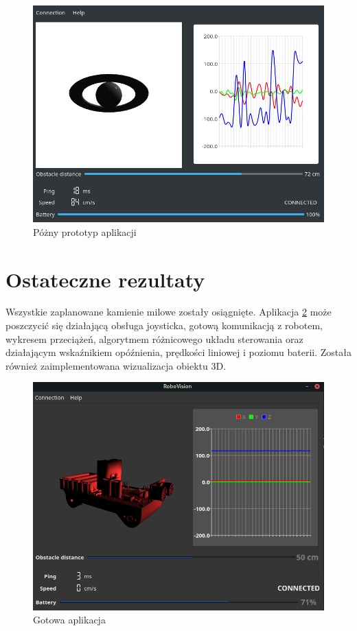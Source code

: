 \documentclass[12pt,a4paper,polish]{article}
\begin{document}
  \begin{figure}[ht]
    \centering
    \includegraphics[width=1\textwidth]{img/app.png}
    \caption{Póżny prototyp aplikacji}
    \label{fig:proto}
  \end{figure}
  
  \newpage
  \section{Ostateczne rezultaty}
  Wszystkie zaplanowane kamienie milowe zostały osiągnięte. Aplikacja \ref{fig:app} może 
  poszczycić się działającą obsługa joysticka, gotową komunikacją z robotem,
  wykresem przeciążeń, algorytmem różnicowego układu sterowania oraz działającym
  wskaźnikiem opóźnienia, prędkości liniowej i poziomu baterii. 
  Została również zaimplementowana wizualizacja obiektu 3D. 

  \begin{figure}[ht]
    \centering
    \includegraphics[width=1\textwidth]{img/final/app.png}
    \caption{Gotowa aplikacja}
    \label{fig:app}
  \end{figure}
\end{document}
